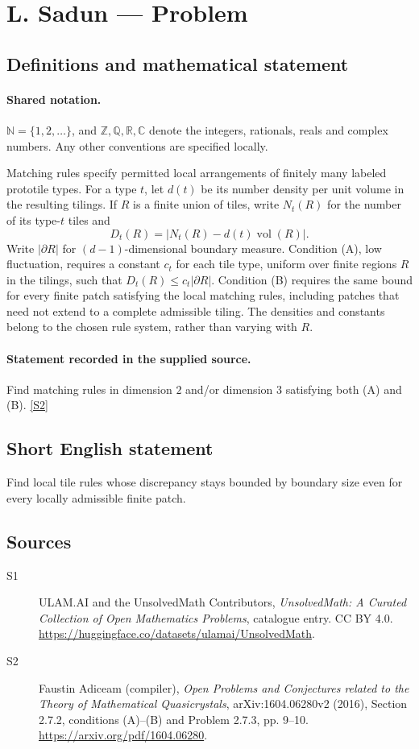 \documentclass[11pt]{article}
\newcommand{\sref}[2]{\hyperlink{source:#1:#2}{[S#2]}}
\begin{document}
\section{L. Sadun — Problem}\label{statement}

\subsection{Definitions and mathematical statement}

\paragraph{Shared notation.}$\mathbb N=\{1,2,\ldots\}$, and $\mathbb Z,\mathbb Q,\mathbb R,\mathbb C$ denote the integers, rationals, reals and complex numbers. Any other conventions are specified locally.


Matching rules specify permitted local arrangements of finitely many labeled prototile types. For a type $t$, let $d(t)$ be its number density per unit volume in the resulting tilings. If $R$ is a finite union of tiles, write $N_t(R)$ for the number of its type-$t$ tiles and
\[D_t(R)=|N_t(R)-d(t)\operatorname{vol}(R)|.\]
Write $|\partial R|$ for $(d-1)$-dimensional boundary measure. Condition (A), low fluctuation, requires a constant $c_t$ for each tile type, uniform over finite regions $R$ in the tilings, such that $D_t(R)\leq c_t|\partial R|$. Condition (B) requires the same bound for every finite patch satisfying the local matching rules, including patches that need not extend to a complete admissible tiling. The densities and constants belong to the chosen rule system, rather than varying with $R$.
\paragraph{Statement recorded in the supplied source.}
Find matching rules in dimension $2$ and/or dimension $3$ satisfying both (A) and (B). \sref{statement}{2}
\subsection{Short English statement}
Find local tile rules whose discrepancy stays bounded by boundary size even for every locally admissible finite patch.
\subsection{Sources}
\begin{description}
\item[\hypertarget{source:statement:1}{S1}] ULAM.AI and the UnsolvedMath Contributors, \emph{UnsolvedMath: A Curated Collection of Open Mathematics Problems}, catalogue entry. CC BY 4.0. \url{https://huggingface.co/datasets/ulamai/UnsolvedMath}.
\item[\hypertarget{source:statement:2}{S2}] Faustin Adiceam (compiler), \emph{Open Problems and Conjectures related to the Theory of Mathematical Quasicrystals}, arXiv:1604.06280v2 (2016), Section 2.7.2, conditions (A)--(B) and Problem 2.7.3, pp. 9--10. \url{https://arxiv.org/pdf/1604.06280}.
\end{description}
\label{end:statement}
\end{document}
